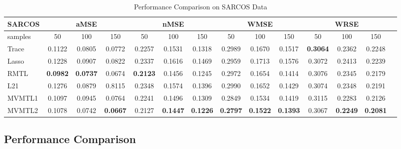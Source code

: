 \documentclass{article}
\newcounter{thm_counter}
\newcounter{pro_counter}
\newcounter{ass_counter}
\begin{document}
%
%
\begin{table}[htb]
\begin{tabular}{|p{1cm}|c|c|c|c|c|c|c|c|c|c|c|c|c|}
\hline 
\tiny SARCOS & \multicolumn{3}{c|}{aMSE} & \multicolumn{3}{c|}{nMSE} & \multicolumn{3}{c|}{WMSE} & \multicolumn{3}{c|}{WRSE}\tabularnewline
\hline 
\tiny samples & 50 & 100 & 150 & 50 & 100 & 150 & 50 & 100 & 150 & 50 & 100 & 150\tabularnewline
\hline 
\tiny Trace & 0.1122 & 0.0805 & 0.0772 & 0.2257 & 0.1531 & 0.1318 & 0.2989 & 0.1670 & 0.1517 & \textbf{0.3064} & 0.2362 & 0.2248\tabularnewline
\hline 
\tiny Lasso & 0.1228 & 0.0907 & 0.0822 & 0.2337 & 0.1616 & 0.1469 & 0.2959 & 0.1713 & 0.1576 & 0.3072 & 0.2413 & 0.2239\tabularnewline
\hline 
\tiny RMTL & \small\textbf{0.0982} & \small\textbf{0.0737} & 0.0674 & \small\textbf{0.2123} & 0.1456 & 0.1245 & 0.2972 & 0.1654 & 0.1414 & 0.3076 & 0.2345 & 0.2179\tabularnewline
\hline 
\tiny L21  & 0.1276 & 0.0879 & 0.8115 & 0.2348 & 0.1574 & 0.1396 & 0.2990 & 0.1652 & 0.1429 & 0.3074 & 0.2348 & 0.2191\tabularnewline
\hline 
\tiny MVMTL1 & 0.1097 & 0.0945 & 0.0764 & 0.2241 & 0.1496 & 0.1309 & 0.2849 & 0.1534 & 0.1419 & 0.3115 & 0.2283 & 0.2126\tabularnewline
\hline 
\tiny MVMTL2 & 0.1078 & 0.0742 & \small\textbf{0.0667} & 0.2127 & \small\textbf{0.1447} & \textbf{0.1226} & \textbf{0.2797} & \small\textbf{0.1522} & \small\textbf{0.1393} & 0.3067 & \small\textbf{0.2249} & \small\textbf{0.2081}\tabularnewline
\hline 
\end{tabular}
\caption{Performance Comparison on SARCOS Data}
\label{tab:per_sarcos}
\end{table}


%

\subsection{Performance Comparison}
\end{document}
